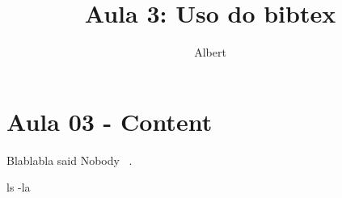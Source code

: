 \documentclass[a4paper]{article}
\author{Albert}
\title{Aula 3: Uso do bibtex}
\begin{document}

\section*{Aula 03 - Content}


Blablabla said Nobody ~\cite{einstein1950bed}.

\newcommand{\aliasl}{ls -la}
\aliasl

{}


\end{document}
